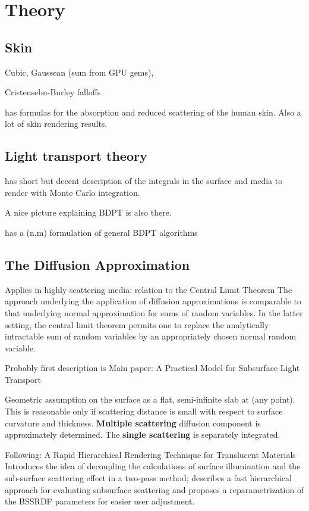 \chapter{Theory}
\label{chapter:Theory}

\section{Skin}

Cubic, Gaussean (sum from GPU gems),

Cristensebn-Burley falloffs 

\cite{EGWR:EGSR06:409-417} has formulas for the absorption and reduced scattering of the human skin. Also a lot of skin rendering results.

\section{Light transport theory}
\cite{Lafortune:1996:RPM:275458.275468} has short but decent description of the
integrals in the surface and media to render with Monte Carlo integration.

A nice picture explaining BDPT is also there.

\cite{Veach:94:BDPT} has a (n,m) formulation of general BDPT algorithms

\section{The Diffusion Approximation}
Applies in highly scattering media: relation to the Central Limit Theorem
The approach underlying the application of diffusion approximations is comparable to that underlying normal approximation for
sums of random variables. In the latter setting, the central limit theorem
permits one to replace the analytically intractable sum of random variables by
an appropriately chosen normal random variable.

Probably first description is \cite{Stam1995}
Main paper: A Practical Model for Subsurface Light Transport \cite{Jensen:2001:PMS:383259.383319}

Geometric assumption on the surface as a flat, semi-infinite slab at (any
point). This is reasonable only if scattering distance is small with respect to
surface curvature and thickness. \textbf{Multiple scattering} diffusion
component is approximately determined. The \textbf{single scattering} is
separately integrated.

Following: A Rapid Hierarchical Rendering Technique for Translucent Materials\\
\cite{Jensen:2002:RHR:566570.566619} Introduces the idea of decoupling the calculations of surface
illumination and the sub-surface scattering effect in a two-pass method;
describes a fast hierarchical approach for evaluating subsurface scattering
and proposes a reparametrization of the BSSRDF parameters for easier user adjustment.

